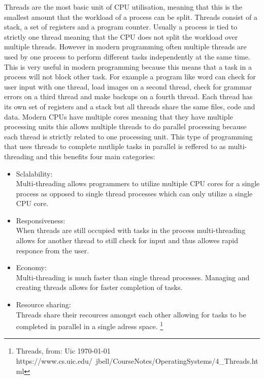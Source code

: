 Threads are the most basic unit of CPU utilisation, meaning that this is the smallest amount that the workload of a 
process can be split. Threads consist of a stack, a set of registers and a program counter. Usually a process
is tied to strictly one thread meaning that the CPU does not split the workload over multiple threads. However in
modern programming often multiple threads are used by one process to perform different tasks independently at the
same time. This is very useful in modern programming because this means that a task in a process will not block 
other task. For example a program like word can check for user input with one thread, load images on a second thread,
check for grammar errors on a third thread and make backups on a fourth thread. Each thread has its own set of registers
and a stack but all threads share the same files, code and data. Modern CPUs have multiple cores meaning that they have
multiple processing units this allows multiple threads to do parallel processing because each thread is strictly
related to one processing unit. This type of programming that uses threads to complete mutliple tasks
in parallel is reffered to as multi-threading and this benefits four main categories:


\begin{itemize}
\item Sclalability: \\

Multi-threading allows programmers to utilize multiple CPU cores for a single process as opposed to single
thread processes which can only utilize a single CPU core.

\item Responsiveness: \\

When threads are still occupied with tasks in the process multi-threading allows for another thread
to still check for input and thus allowes rapid responce from the user.

\item Economy: \\

Multi-threading is much faster than single thread processes. Managing and creating threads allows for
faster completion of tasks.

\item Resource sharing: \\

Threads share their recources amongst each other allowing for tasks to be completed in parallel in a
single adress space. \footnote{Threads, from: Uic \today \\ https://www.cs.uic.edu/~jbell/CourseNotes/OperatingSystems/4\_Threads.html }

\end{itemize}

